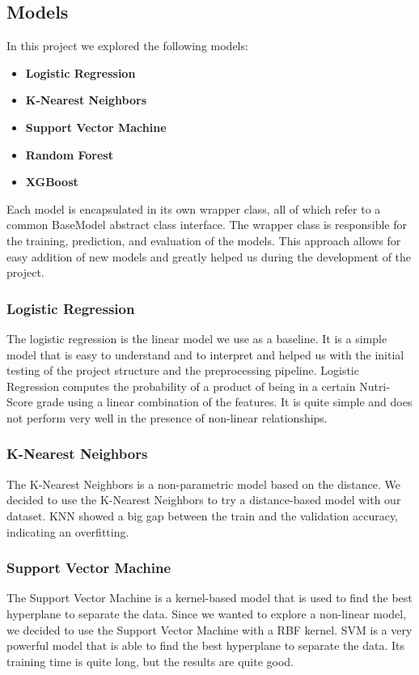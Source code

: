 \documentclass[11pt,a4paper]{article}
\begin{document}
\subsection{Models}
In this project we explored the following models:
\begin{itemize}
    \item \textbf{Logistic Regression}
    \item \textbf{K-Nearest Neighbors}
    \item \textbf{Support Vector Machine}
    \item \textbf{Random Forest}
    \item \textbf{XGBoost}
\end{itemize}
Each model is encapsulated in its own wrapper class, all of which refer to a common BaseModel abstract class interface.
The wrapper class is responsible for the training, prediction, and evaluation of the models.
This approach allows for easy addition of new models and greatly helped us during the development of the project.
\subsubsection{Logistic Regression}
The logistic regression is the linear model we use as a baseline. It is a simple model that is easy to understand and to interpret and helped us
with the initial testing of the project structure and the preprocessing pipeline.
Logistic Regression computes the probability of a product of being in a certain Nutri-Score grade using a linear combination of the features.
It is quite simple and does not perform very well in the presence of non-linear relationships.

\subsubsection{K-Nearest Neighbors}
The K-Nearest Neighbors is a non-parametric model based on the distance. We decided to use the K-Nearest Neighbors
to try a distance-based model with our dataset.
KNN showed a big gap between the train and the validation accuracy, indicating an overfitting.

\subsubsection{Support Vector Machine}
The Support Vector Machine is a kernel-based model that is used to find the best hyperplane to separate the data.
Since we wanted to explore a non-linear model, we decided to use the Support Vector Machine with a RBF kernel.
SVM is a very powerful model that is able to find the best hyperplane to separate the data. Its training time is
quite long, but the results are quite good.
\end{document}
